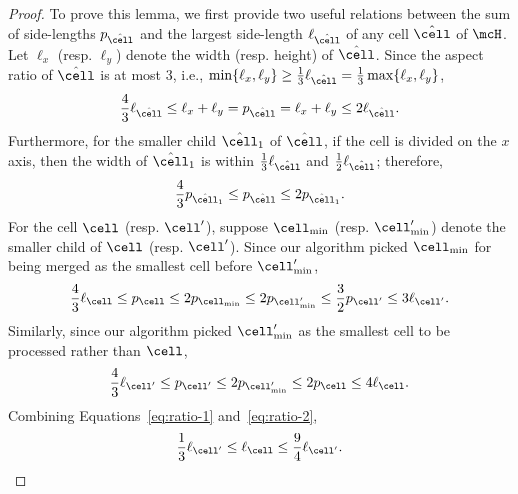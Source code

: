 \begin{proof}
    To prove this lemma, we first provide two useful relations between the sum of side-lengths $p_{\hat{\cell}}$ and the largest side-length $\ell_{\hat{\cell}}$ of any cell $\hat{\cell}$ of $\mcH$. Let $\ell_x$ (resp. $\ell_y$) denote the width (resp. height) of $\hat\cell$. Since the aspect ratio of $\hat{\cell}$ is at most $3$, i.e., $\min\{\ell_x, \ell_y\} \ge \frac{1}{3}\ell_{\hat{\cell}} = \frac{1}{3}\max\{\ell_x, \ell_y\}$, 
    \begin{equation*}\label{eq:ratio-edge}
        \frac{4}{3}\ell_{\hat{\cell}} \le \ell_x + \ell_y = p_{\hat{\cell}} =\ell_x + \ell_y \le 2\ell_{\hat{\cell}}.
    \end{equation*}
    Furthermore, for the smaller child $\hat{\cell}_1$ of $\hat{\cell}$, if the cell is divided on the $x$ axis, then the width of $\hat{\cell}_1$ is within  $\frac{1}{3}\ell_{\hat\cell}$ and $\frac{1}{2}\ell_{\hat\cell}$; therefore,
    \begin{equation*}
        \frac{4}{3}p_{\hat{\cell}_1}\le p_{\hat\cell} \le 2 p_{\hat{\cell}_1}.
    \end{equation*}
    For the cell $\cell$ (resp. $\cell'$), suppose $\cell_{\min}$ (resp. $\cell'_{\min}$) denote the smaller child of $\cell$ (resp. $\cell'$). Since our algorithm picked $\cell_{\min}$ for being merged as the smallest cell before $\cell'_{\min}$, 
    \begin{equation}\label{eq:ratio-1}
        \frac{4}{3}\ell_\cell\le p_\cell\le 2p_{\cell_{\min}}\le 2p_{\cell'_{\min}}\le \frac{3}{2}p_{\cell'}\le 3\ell_{\cell'}.
    \end{equation}
    Similarly, since our algorithm picked $\cell'_{\min}$ as the smallest cell to be processed rather than $\cell$,
    \begin{equation}\label{eq:ratio-2}
        \frac{4}{3}\ell_{\cell'}\le p_{\cell'}\le 2p_{\cell'_{\min}}\le 2p_{\cell}\le 4\ell_\cell.
    \end{equation}
    Combining Equations~\eqref{eq:ratio-1} and~\eqref{eq:ratio-2},
    \begin{equation*}
        \frac{1}{3} \ell_{\cell'} \le \ell_\cell \le \frac{9}{4} \ell_{\cell'}.
    \end{equation*}
\end{proof}




